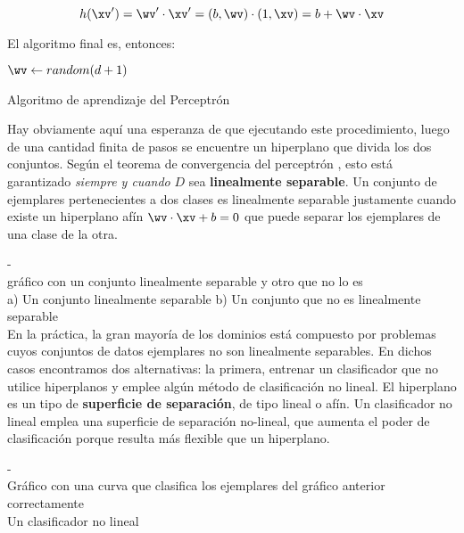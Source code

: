 \begin{equation}
 h(\xv')= \wv' \cdot \xv' = (b,\wv) \cdot (1,\xv) = b + \wv \cdot \xv
 \end{equation}

El algoritmo final es, entonces:

\begin{algorithm}[H]
$\wv \leftarrow random(d+1)$\;
\caption{Algoritmo de aprendizaje del Perceptrón} 
\end{algorithm}

Hay obviamente aquí una esperanza de que ejecutando este procedimiento, luego de una cantidad finita de pasos se encuentre un hiperplano que divida los dos conjuntos. Según el teorema de convergencia del perceptrón \cite{haykin1994}, esto está garantizado  \textit{siempre y cuando} $D$ sea \textbf{linealmente separable}. Un conjunto de ejemplares pertenecientes a dos clases es linealmente separable justamente cuando existe un hiperplano afín $\wv \cdot \xv +b=0$ que puede separar los ejemplares de una clase de la otra.

-\\ gráfico con un conjunto linealmente separable y otro que no lo es\\
a) Un conjunto linealmente separable b) Un conjunto que no es linealmente separable\\

En la práctica, la gran mayoría de los dominios está compuesto por problemas cuyos conjuntos de datos ejemplares no son linealmente separables. En dichos casos encontramos dos alternativas: la primera, entrenar un clasificador que no utilice hiperplanos y emplee algún método de clasificación no lineal. El hiperplano es un tipo de \textbf{superficie de separación}, de tipo lineal o afín. Un clasificador no lineal emplea una superficie de separación no-lineal, que aumenta el poder de clasificación porque resulta más flexible que un hiperplano.

-\\
Gráfico con una curva que clasifica los ejemplares del gráfico anterior correctamente \\ 
Un clasificador no lineal\\

